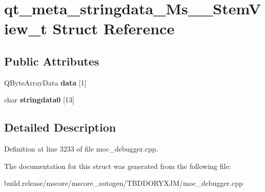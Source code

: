 \hypertarget{structqt__meta__stringdata___ms_____stem_view__t}{}\section{qt\+\_\+meta\+\_\+stringdata\+\_\+\+Ms\+\_\+\+\_\+\+Stem\+View\+\_\+t Struct Reference}
\label{structqt__meta__stringdata___ms_____stem_view__t}
\subsection*{Public Attributes}
\begin{DoxyCompactItemize}
\item 
\mbox{\label{structqt__meta__stringdata___ms_____stem_view__t_aae7e29ca3268f76517ac72e909ff1530}} 
Q\+Byte\+Array\+Data {\bfseries data} \mbox{[}1\mbox{]}
\item 
\mbox{\label{structqt__meta__stringdata___ms_____stem_view__t_a6896d3a826f2a2ad2448e54ca6ca9e4c}} 
char {\bfseries stringdata0} \mbox{[}13\mbox{]}
\end{DoxyCompactItemize}


\subsection{Detailed Description}


Definition at line 3233 of file moc\+\_\+debugger.\+cpp.



The documentation for this struct was generated from the following file\+:\begin{DoxyCompactItemize}
\item 
build.\+release/mscore/mscore\+\_\+autogen/\+T\+B\+D\+D\+O\+R\+Y\+X\+J\+M/moc\+\_\+debugger.\+cpp\end{DoxyCompactItemize}
